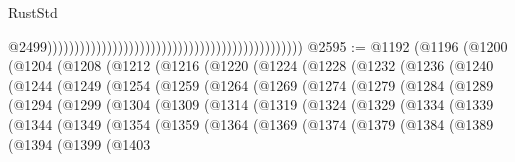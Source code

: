 \begin{lexlean}{RustStd}
\begin{coremodule}
                                                                                                  @2499)))))))))))))))))))))))))))))))))))))))))))))))
@2595 := @1192
    (@1196
      (@1200
        (@1204
          (@1208
            (@1212
              (@1216
                (@1220
                  (@1224
                    (@1228
                      (@1232
                        (@1236
                          (@1240
                            (@1244
                              (@1249
                                (@1254
                                  (@1259
                                    (@1264
                                      (@1269
                                        (@1274
                                          (@1279
                                            (@1284
                                              (@1289
                                                (@1294
                                                  (@1299
                                                    (@1304
                                                      (@1309
                                                        (@1314
                                                          (@1319
                                                            (@1324
                                                              (@1329
                                                                (@1334
                                                                  (@1339
                                                                    (@1344
                                                                      (@1349
                                                                        (@1354
                                                                          (@1359
                                                                            (@1364
                                                                              (@1369
                                                                                (@1374
                                                                                  (@1379
                                                                                    (@1384
                                                                                      (@1389
                                                                                        (@1394
                                                                                          (@1399
                                                                                            (@1403

\end{coremodule}
\end{lexlean}
